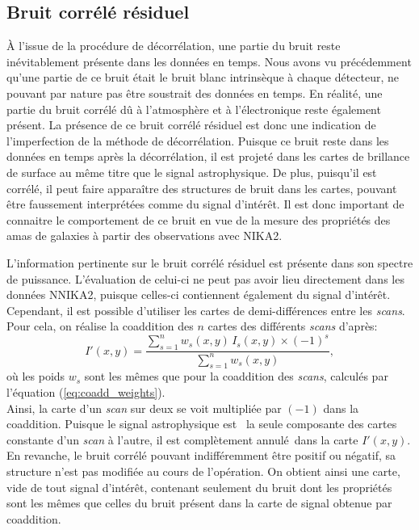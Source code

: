 \subsection{Bruit corrélé résiduel}\label{sec:noise_pk}

À l'issue de la procédure de décorrélation, une partie du bruit reste inévitablement présente dans les données en temps.
Nous avons vu précédemment qu'une partie de ce bruit était le bruit blanc intrinsèque à chaque détecteur, ne pouvant par nature pas être soustrait des données en temps.
En réalité, une partie du bruit corrélé dû à l'atmosphère et à l'électronique reste également présent.
La présence de ce bruit corrélé résiduel est donc une indication de l'imperfection de la méthode de décorrélation.
Puisque ce bruit reste dans les données en temps après la décorrélation, il est projeté dans les cartes de brillance de surface au même titre que le signal astrophysique.
De plus, puisqu'il est corrélé, il peut faire apparaître des structures de bruit dans les cartes, pouvant être faussement interprétées comme du signal d'intérêt.
Il est donc important de connaitre le comportement de ce bruit en vue de la mesure des propriétés des amas de galaxies à partir des observations avec NIKA2.

L'information pertinente sur le bruit corrélé résiduel est présente dans son spectre de puissance.
L'évaluation de celui-ci ne peut pas avoir lieu directement dans les données NNIKA2, puisque celles-ci contiennent également du signal d'intérêt.
Cependant, il est possible d'utiliser les cartes de demi-différences entre les \textit{scans}.
Pour cela, on réalise la coaddition des $n$ cartes des différents \textit{scans} d'après:
\begin{equation}
    I'(x, y) = \frac{\sum_{s=1}^{n} w_s(x, y) \, I_s(x, y) \times (-1)^s}{\sum_{s=1}^{n} w_s(x, y)},
\end{equation}
où les poids $w_s$ sont les mêmes que pour la coaddition des \textit{scans}, calculés par l'équation (\ref{eq:coadd_weights}). \\
Ainsi, la carte d'un \textit{scan} sur deux se voit multipliée par $(-1)$ dans la coaddition.
Puisque le signal astrophysique est \prior\ la seule composante des cartes constante d'un \textit{scan} à l'autre, il est complètement annulé\footnotemark\ dans la carte $I'(x, y)$.
En revanche, le bruit corrélé pouvant indifféremment être positif ou négatif, sa structure n'est pas modifiée au cours de l'opération.
On obtient ainsi une carte, vide de tout signal d'intérêt, contenant seulement du bruit dont les propriétés sont les mêmes que celles du bruit présent dans la carte de signal obtenue par coaddition.


